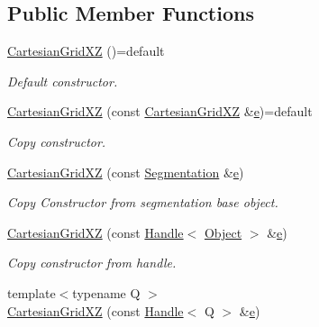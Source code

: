 \subsection*{Public Member Functions}
\begin{DoxyCompactItemize}
\item 
\hyperlink{class_d_d4hep_1_1_geometry_1_1_cartesian_grid_x_z_ad31b6b63475b553c5b1d7e603c5704f5}{Cartesian\+Grid\+XZ} ()=default
\begin{DoxyCompactList}\small\item\em Default constructor. \end{DoxyCompactList}\item 
\hyperlink{class_d_d4hep_1_1_geometry_1_1_cartesian_grid_x_z_a0dfbb2e5dba3cb5c35a4511dfc75493e}{Cartesian\+Grid\+XZ} (const \hyperlink{class_d_d4hep_1_1_geometry_1_1_cartesian_grid_x_z}{Cartesian\+Grid\+XZ} \&\hyperlink{_volumes_8cpp_a8a9a1f93e9b09afccaec215310e64142}{e})=default
\begin{DoxyCompactList}\small\item\em Copy constructor. \end{DoxyCompactList}\item 
\hyperlink{class_d_d4hep_1_1_geometry_1_1_cartesian_grid_x_z_a9db23330d388e78285ae0c5597fc5617}{Cartesian\+Grid\+XZ} (const \hyperlink{class_d_d4hep_1_1_geometry_1_1_segmentation}{Segmentation} \&\hyperlink{_volumes_8cpp_a8a9a1f93e9b09afccaec215310e64142}{e})
\begin{DoxyCompactList}\small\item\em Copy Constructor from segmentation base object. \end{DoxyCompactList}\item 
\hyperlink{class_d_d4hep_1_1_geometry_1_1_cartesian_grid_x_z_a2ac7c5874abd765734541bd8adde8ca0}{Cartesian\+Grid\+XZ} (const \hyperlink{class_d_d4hep_1_1_handle}{Handle}$<$ \hyperlink{class_d_d4hep_1_1_geometry_1_1_cartesian_grid_x_z_aba1e511c43a8b46f2524a1253c660f10}{Object} $>$ \&\hyperlink{_volumes_8cpp_a8a9a1f93e9b09afccaec215310e64142}{e})
\begin{DoxyCompactList}\small\item\em Copy constructor from handle. \end{DoxyCompactList}\item 
{\footnotesize template$<$typename Q $>$ }\\\hyperlink{class_d_d4hep_1_1_geometry_1_1_cartesian_grid_x_z_a827c964aa46de749f22918840db49421}{Cartesian\+Grid\+XZ} (const \hyperlink{class_d_d4hep_1_1_handle}{Handle}$<$ Q $>$ \&\hyperlink{_volumes_8cpp_a8a9a1f93e9b09afccaec215310e64142}{e})

\end{DoxyCompactItemize}
